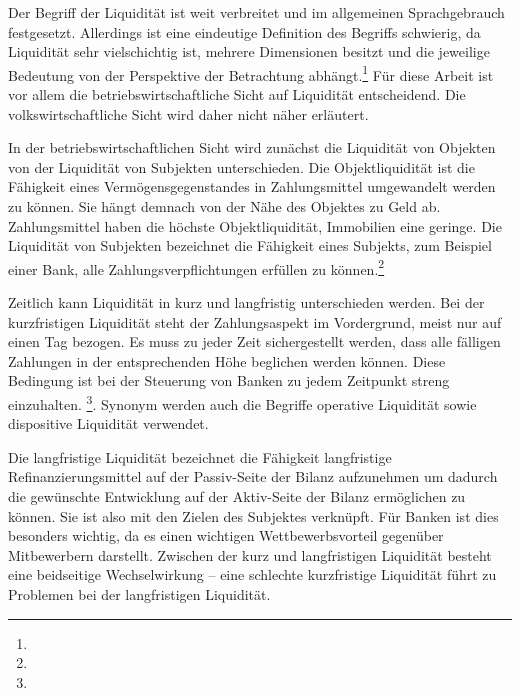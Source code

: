 Der Begriff der Liquidität ist weit verbreitet und im allgemeinen Sprachgebrauch festgesetzt. Allerdings ist eine eindeutige Definition des Begriffs schwierig, da Liquidität sehr vielschichtig ist, mehrere Dimensionen besitzt und die jeweilige Bedeutung von der Perspektive der Betrachtung abhängt.\footnote{ } Für diese Arbeit ist vor allem die betriebswirtschaftliche Sicht auf Liquidität entscheidend. Die volkswirtschaftliche Sicht wird daher nicht näher erläutert.

In der betriebswirtschaftlichen Sicht wird zunächst die Liquidität von Objekten von der Liquidität von Subjekten unterschieden. Die Objektliquidität ist die Fähigkeit eines Vermögensgegenstandes in Zahlungsmittel umgewandelt werden zu können. Sie hängt demnach von der Nähe des Objektes zu Geld ab. Zahlungsmittel haben die höchste Objektliquidität, Immobilien eine geringe. Die Liquidität von Subjekten bezeichnet die Fähigkeit eines Subjekts, zum Beispiel einer Bank, alle Zahlungsverpflichtungen erfüllen zu können.\footnote{ }

Zeitlich kann Liquidität in kurz und langfristig unterschieden werden. Bei der kurzfristigen Liquidität steht der Zahlungsaspekt im Vordergrund, meist nur auf einen Tag bezogen. Es muss zu jeder Zeit sichergestellt werden, dass alle fälligen Zahlungen in der entsprechenden Höhe beglichen werden können. Diese Bedingung ist bei der Steuerung von Banken zu jedem Zeitpunkt streng einzuhalten. \footnote{ }. Synonym werden auch die Begriffe operative Liquidität sowie dispositive Liquidität verwendet.

Die langfristige Liquidität bezeichnet die Fähigkeit langfristige Refinanzierungsmittel auf der Passiv-Seite der Bilanz aufzunehmen um dadurch die gewünschte Entwicklung auf der Aktiv-Seite der Bilanz ermöglichen zu können. Sie ist also mit den Zielen des Subjektes verknüpft. Für Banken ist dies besonders wichtig, da es einen wichtigen Wettbewerbsvorteil gegenüber Mitbewerbern darstellt. Zwischen der kurz und langfristigen Liquidität besteht eine beidseitige Wechselwirkung -- eine schlechte kurzfristige Liquidität führt zu Problemen bei der langfristigen Liquidität.


